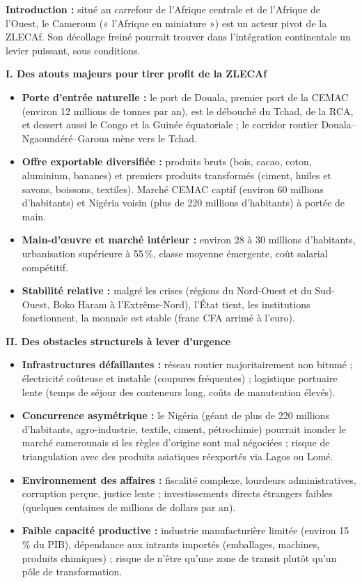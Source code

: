 \documentclass[11pt]{article}
\begin{document}
\begin{corrige}
\textbf{Introduction :} situé au carrefour de l'Afrique centrale et de l'Afrique de l'Ouest, le Cameroun (« l'Afrique en miniature ») est un acteur pivot de la ZLECAf. Son décollage freiné pourrait trouver dans l'intégration continentale un levier puissant, sous conditions.

\textbf{I. Des atouts majeurs pour tirer profit de la ZLECAf}
\begin{itemize}
    \item \textbf{Porte d'entrée naturelle :} le port de Douala, premier port de la CEMAC (environ 12 millions de tonnes par an), est le débouché du Tchad, de la RCA, et dessert aussi le Congo et la Guinée équatoriale ; le corridor routier Douala--Ngaoundéré--Garoua mène vers le Tchad.
    \item \textbf{Offre exportable diversifiée :} produits bruts (bois, cacao, coton, aluminium, bananes) et premiers produits transformés (ciment, huiles et savons, boissons, textiles). Marché CEMAC captif (environ 60 millions d'habitants) et Nigéria voisin (plus de 220 millions d'habitants) à portée de main.
    \item \textbf{Main-d'œuvre et marché intérieur :} environ 28 à 30 millions d'habitants, urbanisation supérieure à 55\,\%, classe moyenne émergente, coût salarial compétitif.
    \item \textbf{Stabilité relative :} malgré les crises (régions du Nord-Ouest et du Sud-Ouest, Boko Haram à l'Extrême-Nord), l'État tient, les institutions fonctionnent, la monnaie est stable (franc CFA arrimé à l'euro).
\end{itemize}

\textbf{II. Des obstacles structurels à lever d'urgence}
\begin{itemize}
    \item \textbf{Infrastructures défaillantes :} réseau routier majoritairement non bitumé ; électricité coûteuse et instable (coupures fréquentes) ; logistique portuaire lente (temps de séjour des conteneurs long, coûts de manutention élevés).
    \item \textbf{Concurrence asymétrique :} le Nigéria (géant de plus de 220 millions d'habitants, agro-industrie, textile, ciment, pétrochimie) pourrait inonder le marché camerounais si les règles d'origine sont mal négociées ; risque de triangulation avec des produits asiatiques réexportés via Lagos ou Lomé.
    \item \textbf{Environnement des affaires :} fiscalité complexe, lourdeurs administratives, corruption perçue, justice lente ; investissements directs étrangers faibles (quelques centaines de millions de dollars par an).
    \item \textbf{Faible capacité productive :} industrie manufacturière limitée (environ 15\,\% du PIB), dépendance aux intrants importés (emballages, machines, produits chimiques) ; risque de n'être qu'une zone de transit plutôt qu'un pôle de transformation.
\end{itemize}


\end{corrige}
\end{document}
